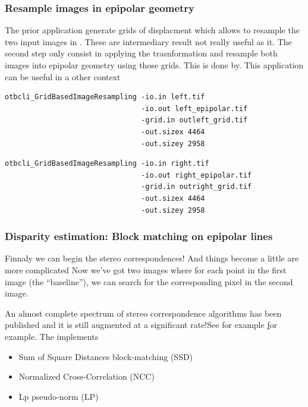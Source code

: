 \subsubsection{Resample images in epipolar geometry}
The prior application generate grids of displacment which allows to resample the two input images in . These are intermediary result not really useful as it. The second step only consist in applying the trasnformation and resample both images into epipolar geometry using those grids. This is done by. This application can be useful in a other context

\begin{verbatim}
otbcli_GridBasedImageResampling -io.in left.tif
                                -io.out left_epipolar.tif
                                -grid.in outleft_grid.tif
                                -out.sizex 4464
                                -out.sizey 2958
\end{verbatim}

\begin{verbatim}
otbcli_GridBasedImageResampling -io.in right.tif
                                -io.out right_epipolar.tif
                                -grid.in outright_grid.tif
                                -out.sizex 4464
                                -out.sizey 2958
\end{verbatim}


\subsubsection{Disparity estimation: Block matching on epipolar lines}

Finnaly we can begin the stereo correspondences! And things become a little are more complicated
Now we've got two images where for each point in the first image (the ``baseline''), we can search for the corresponding pixel in the second image.

An almost complete spectrum of stereo correspondence algorithms has been published and it is still augmented at a significant rate!See for example \href{http://en.wikipedia.org/wiki/Block-matching_algorithm} for example. The \otb implements
\begin{itemize}
\item Sum of Square Distances block-matching (SSD)
\item Normalized Cross-Correlation (NCC)
\item Lp pseudo-norm (LP)
\end{itemize}

